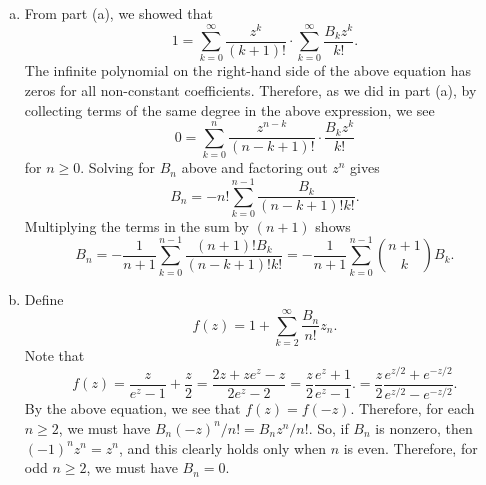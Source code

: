 \begin{pb}[4]
\begin{soln}
\begin{enumerate}[(a)]
    \item
        From part (a), we showed that
        \begin{equation*}
            1 = \sum_{k = 0}^{\infty} \frac{z^k}{(k + 1)!} 
            \cdot \sum_{k = 0}^{\infty} \frac{B_k z^k}{k!}.
        \end{equation*}
        The infinite polynomial on the right-hand side of the above equation
        has zeros for all non-constant coefficients.
        Therefore, as we did in part (a),
        by collecting terms of the same degree in the above expression, we see
        \begin{equation*}
            0 = \sum_{k = 0}^{n} \frac{z^{n - k}}{(n - k + 1)!} \cdot \frac{B_k z^k}{k!}
        \end{equation*}
        for \(n \geq 0\).
        Solving for \(B_n\) above and factoring out \(z^n\) gives
        \begin{equation*}
            B_n = -n! \sum_{k = 0}^{n - 1} \frac{B_k}{(n - k + 1)! k!}.
        \end{equation*}
        Multiplying the terms in the sum by \((n + 1)\) shows
        \begin{equation*}
            B_n = -\frac{1}{n + 1} \sum_{k = 0}^{n - 1} \frac{(n + 1)! B_k}{(n - k + 1)! k !}
            = -\frac{1}{n + 1} \sum_{k = 0}^{n - 1} \binom{n + 1}{k} B_k.
        \end{equation*}
    
    \item
        Define
        \begin{equation*}
            f(z) = 1 + \sum_{k = 2}^{\infty} \frac{B_n}{n!} z_n.
        \end{equation*}
        Note that
        \begin{equation*}
            f(z) = \frac{z}{e^z - 1} + \frac{z}{2} = \frac{2z + ze^z - z}{2e^z - 2}
            = \frac{z}{2} \frac{e^z + 1}{e^z - 1}.
            = \frac{z}{2} \frac{e^{z / 2} + e^{- z / 2}}{e^{z / 2} - e^{-z / 2}}.
        \end{equation*}
        By the above equation, we see that \(f(z) = f(-z)\).
        Therefore, for each \(n \geq 2\), we must have \(B_n (-z)^n / n! = B_n z^n / n!\).
        So, if \(B_n\) is nonzero, then \((-1)^n z^n = z^n\),
        and this clearly holds only when \(n\) is even.
        Therefore, for odd \(n \geq 2\), we must have \(B_n = 0\).


\end{enumerate}
\end{soln}
\end{pb}
